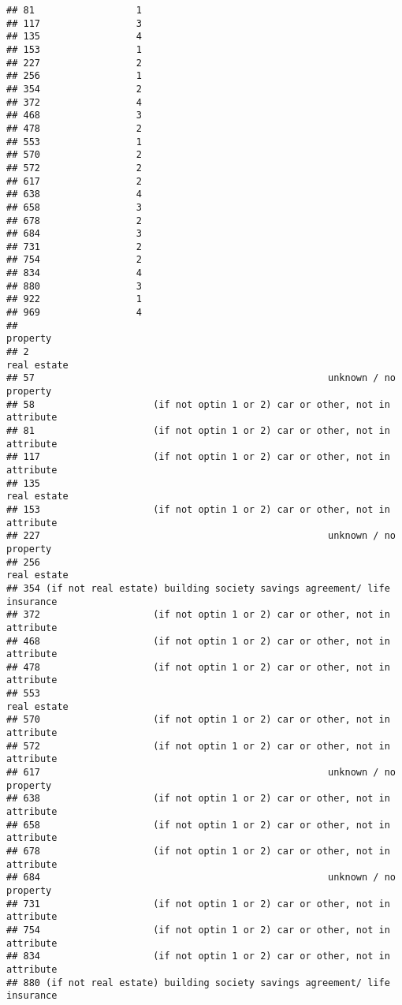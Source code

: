 \documentclass[
]{article}
\begin{document}
\begin{verbatim}
## 81                  1
## 117                 3
## 135                 4
## 153                 1
## 227                 2
## 256                 1
## 354                 2
## 372                 4
## 468                 3
## 478                 2
## 553                 1
## 570                 2
## 572                 2
## 617                 2
## 638                 4
## 658                 3
## 678                 2
## 684                 3
## 731                 2
## 754                 2
## 834                 4
## 880                 3
## 922                 1
## 969                 4
##                                                                    property
## 2                                                               real estate
## 57                                                    unknown / no property
## 58                     (if not optin 1 or 2) car or other, not in attribute
## 81                     (if not optin 1 or 2) car or other, not in attribute
## 117                    (if not optin 1 or 2) car or other, not in attribute
## 135                                                             real estate
## 153                    (if not optin 1 or 2) car or other, not in attribute
## 227                                                   unknown / no property
## 256                                                             real estate
## 354 (if not real estate) building society savings agreement/ life insurance
## 372                    (if not optin 1 or 2) car or other, not in attribute
## 468                    (if not optin 1 or 2) car or other, not in attribute
## 478                    (if not optin 1 or 2) car or other, not in attribute
## 553                                                             real estate
## 570                    (if not optin 1 or 2) car or other, not in attribute
## 572                    (if not optin 1 or 2) car or other, not in attribute
## 617                                                   unknown / no property
## 638                    (if not optin 1 or 2) car or other, not in attribute
## 658                    (if not optin 1 or 2) car or other, not in attribute
## 678                    (if not optin 1 or 2) car or other, not in attribute
## 684                                                   unknown / no property
## 731                    (if not optin 1 or 2) car or other, not in attribute
## 754                    (if not optin 1 or 2) car or other, not in attribute
## 834                    (if not optin 1 or 2) car or other, not in attribute
## 880 (if not real estate) building society savings agreement/ life insurance

\end{verbatim}
\end{document}
